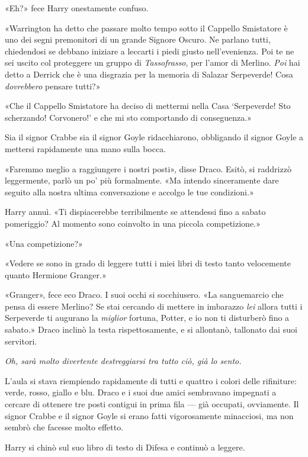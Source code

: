 «Eh?» fece Harry onestamente confuso.

«Warrington ha detto che passare molto tempo sotto il Cappello Smistatore è uno dei segni premonitori di un grande Signore Oscuro. Ne parlano tutti, chiedendosi se debbano iniziare a leccarti i piedi giusto nell’evenienza. Poi te ne sei uscito col proteggere un gruppo di \textit{Tassofrasso}, per l’amor di Merlino. \textit{Poi} hai detto a Derrick che è una disgrazia per la memoria di Salazar Serpeverde! Cosa \textit{dovrebbero} pensare tutti?»

«Che il Cappello Smistatore ha deciso di mettermi nella Casa ‘Serpeverde! Sto scherzando! Corvonero!’ e che mi sto comportando di conseguenza.»

Sia il signor Crabbe sia il signor Goyle ridacchiarono, obbligando il signor Goyle a mettersi rapidamente una mano sulla bocca.

«Faremmo meglio a raggiungere i nostri posti», disse Draco. Esitò, si raddrizzò leggermente, parlò un po’ più formalmente. «Ma intendo sinceramente dare seguito alla nostra ultima conversazione e accolgo le tue condizioni.»

Harry annuì. «Ti dispiacerebbe terribilmente se attendessi fino a sabato pomeriggio? Al momento sono coinvolto in una piccola competizione.»

«Una competizione?»

«Vedere se sono in grado di leggere tutti i miei libri di testo tanto velocemente quanto Hermione Granger.»

«Granger», fece eco Draco. I suoi occhi si socchiusero. «La sanguemarcio che pensa di essere Merlino? Se stai cercando di mettere in imbarazzo \textit{lei} allora tutti i Serpeverde ti augurano la \textit{miglior} fortuna, Potter, e io non ti disturberò fino a sabato.» Draco inclinò la testa rispettosamente, e si allontanò, tallonato dai suoi servitori.

\textit{Oh, sarà molto divertente destreggiarsi tra tutto ciò, già lo sento.}

L’aula si stava riempiendo rapidamente di tutti e quattro i colori delle rifiniture: verde, rosso, giallo e blu. Draco e i suoi due amici sembravano impegnati a cercare di ottenere tre posti contigui in prima fila — già occupati, ovviamente. Il signor Crabbe e il signor Goyle si erano fatti vigorosamente minacciosi, ma non sembrò che facesse molto effetto.

Harry si chinò sul suo libro di testo di Difesa e continuò a leggere.

